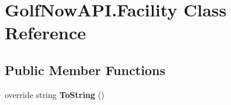 \hypertarget{class_golf_now_a_p_i_1_1_facility}{}\section{Golf\+Now\+A\+P\+I.\+Facility Class Reference}
\label{class_golf_now_a_p_i_1_1_facility}
\subsection*{Public Member Functions}
\begin{DoxyCompactItemize}
\item 
\mbox{\label{class_golf_now_a_p_i_1_1_facility_a33247747fffe1572f46839cdb23649b6}} 
override string {\bfseries To\+String} ()
\end{DoxyCompactItemize}
